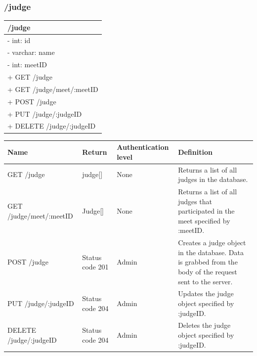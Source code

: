 \documentclass[letterpaper,10pt,draftclsnofoot,onecolumn,]{article}
\begin{document}
\subsubsection{/judge}
\begin{center}
    \begin{tabular}{| p{20em} |}
        \hline
        \textbf{/judge} \\
        \hline
        - int: id \\
        - varchar: name \\
        - int: meetID \\
        \hline
        + GET /judge \\
        + GET /judge/meet/:meetID \\
        + POST /judge \\
        + PUT /judge/:judgeID \\
        + DELETE /judge/:judgeID \\
        \hline
    \end{tabular}
\end{center}
\begin{center}
    \begin{tabular}{ | p{15em} | p{8em} | p{7em} | p{20em} | }
    \hline
    \textbf{Name} & \textbf{Return} & \textbf{Authentication level} & \textbf{Definition} \\
    \hline
    GET /judge & judge[] & None & Returns a list of all judges in the database. \\
    \hline
    GET /judge/meet/:meetID & Judge[] & None & Returns a list of all judges that participated in the meet specified by :meetID. \\
    \hline
    POST /judge & Status code 201 & Admin & Creates a judge object in the database. Data is grabbed from the body of the request sent to the server. \\
    \hline
    PUT /judge/:judgeID & Status code 204 & Admin & Updates the judge object specified by :judgeID. \\
    \hline
    DELETE /judge/:judgeID & Status code 204 & Admin & Deletes the judge object specified by :judgeID. \\
    \hline
    \end{tabular}
\end{center}
\end{document}
